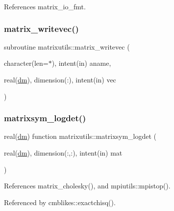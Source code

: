 References matrix\+\_\+io\+\_\+fmt.

\mbox{\label{namespacematrixutils_a122e85102b3eac4266a8031c62de9bbf}} 
\subsubsection{\texorpdfstring{matrix\+\_\+writevec()}{matrix\_writevec()}}
{\footnotesize\ttfamily subroutine matrixutils\+::matrix\+\_\+writevec (\begin{DoxyParamCaption}\item[{character(len=$\ast$), intent(in)}]{aname,  }\item[{real(\mbox{\hyperlink{namespacematrixutils_a7bdc564986ea4d90f51201c75606ef3d}{dm}}), dimension(\+:), intent(in)}]{vec }\end{DoxyParamCaption})}

\mbox{\label{namespacematrixutils_a4117e3e0068005bf79a0db9745a8dde6}} 
\subsubsection{\texorpdfstring{matrixsym\+\_\+logdet()}{matrixsym\_logdet()}}
{\footnotesize\ttfamily real(\mbox{\hyperlink{namespacematrixutils_a7bdc564986ea4d90f51201c75606ef3d}{dm}}) function matrixutils\+::matrixsym\+\_\+logdet (\begin{DoxyParamCaption}\item[{real(\mbox{\hyperlink{namespacematrixutils_a7bdc564986ea4d90f51201c75606ef3d}{dm}}), dimension(\+:,\+:), intent(in)}]{mat }\end{DoxyParamCaption})}



References matrix\+\_\+cholesky(), and mpiutils\+::mpistop().



Referenced by cmblikes\+::exactchisq().

